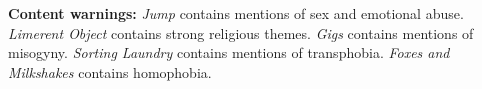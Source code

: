\null

\vfill

\noindent \textbf{Content warnings:} \emph{Jump} contains mentions of sex and emotional abuse. \emph{Limerent Object} contains strong religious themes. \emph{Gigs} contains mentions of misogyny. \emph{Sorting Laundry} contains mentions of transphobia. \emph{Foxes and Milkshakes} contains homophobia.
